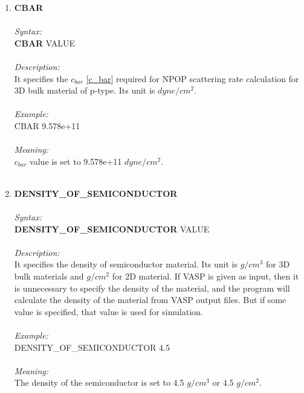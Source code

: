 \documentclass[12pt]{article}
\begin{document}
\begin{enumerate}
    \item \textbf{CBAR} \\ \\
    \textit{Syntax:} \\
    \textbf{CBAR} VALUE \\ \\
    \textit{Description:} \\
    It specifies the $c_{bar}$ \ref{c_bar} required for NPOP scattering rate calculation for 3D bulk material of p-type. Its unit is $dyne/cm^2$. \\ \\
    \textit{Example:} \\
    CBAR 9.578e+11 \\ \\
    \textit{Meaning:} \\ 
    $c_{bar}$ value is set to 9.578e+11 $dyne/cm^2$. \\ \\
    

    \item \textbf{DENSITY\_OF\_SEMICONDUCTOR} \\ \\
    \textit{Syntax:} \\
    \textbf{DENSITY\_OF\_SEMICONDUCTOR} VALUE \\ \\
    \textit{Description:} \\
    It specifies the density of semiconductor material. Its unit is $g/cm^3$ for 3D bulk materials and $g/cm^2$ for 2D material. If VASP is given as input, then it is unnecessary to specify the density of the material, and the program will calculate the density of the material from VASP output files. But if some value is specified, that value is used for simulation. \\ \\
    \textit{Example:} \\
    DENSITY\_OF\_SEMICONDUCTOR 4.5 \\ \\
    \textit{Meaning:} \\ 
    The density of the semiconductor is set to 4.5 $g/cm^3$ or 4.5 $g/cm^2$. \\ \\


\end{enumerate}
\end{document}

